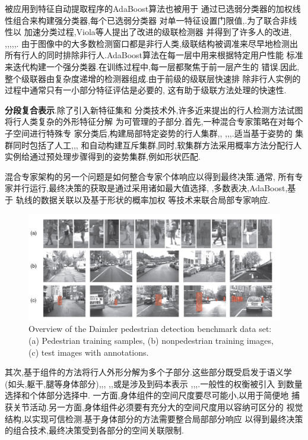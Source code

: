 \documentclass[10pt,letterpaper,journal,compsoc]{IEEEtran}
\begin{document}
被应用到特征自动提取程序的AdaBoost算法\cite{bib18}也被用于
通过已选弱分类器的加权线性组合来构建强分类器,每个已选弱分类器
对单一特征设置门限值\cite{bib60},\cite{bib62}.为了联合非线性以
加速分类过程,Viola等人提出了改进的级联检测器
\cite{bib74}并得到了许多人的改进\cite{bib45},\cite{bib52}
,\cite{bib63},\cite{bib71},\cite{bib76},\cite{bib80},\cite{bib83}.
由于图像中的大多数检测窗口都是非行人类,级联结构被调准来尽早地检测出
所有行人的同时排除非行人.AdaBoost算法在每一层中用来根据特定用户性能
标准来迭代构建一个强分类器.在训练过程中,每一层都聚焦于前一层产生的
错误.因此,整个级联器由复杂度递增的检测器组成.由于前级的级联层快速排
除非行人实例的过程中通常只有一小部分特征评估是必要的,
这有助于级联方法处理的快速性.

\textbf{分段复合表示}.除了引入新特征集和
分类技术外,许多近来提出的行人检测方法试图将行人类复杂的外形特征分解
为可管理的子部分.首先,一种混合专家策略在对每个子空间进行特殊专
家分类后,构建局部特定姿势的行人集群\cite{bib23},\cite{bib51},
\cite{bib62},\cite{bib64},\cite{bib76},\cite{bib80}.适当基于姿势的
集群同时包括了人工\cite{bib51},\cite{bib62},\cite{bib64},\cite{bib76}
和自动构建\cite{bib80}互斥集群,同时,软集群方法采用概率方法分配行人
实例给通过预处理步骤得到的姿势集群,例如形状匹配\cite{bib23}.

混合专家架构的另一个问题是如何整合专家个体响应以得到最终决策.通常,
所有专家并行运行,最终决策的获取是通过采用诸如最大值选择\cite{bib51},
\cite{bib76},多数表决\cite{bib64},AdaBoost\cite{bib62},基于
轨线的数据关联\cite{bib80}以及基于形状的概率加权\cite{bib23}
等技术来联合局部专家响应.

\begin{figure}[!t]
\centering
\includegraphics[width=7in]{fig1.JPG}
\caption{Overview of the Daimler pedestrian detection benchmark data set: (a) Pedestrian training samples, (b) nonpedestrian training images, (c) test
images with annotations.}
\end{figure}

其次,基于组件的方法将行人外形分解为多个子部分.这些部分既受启发于语义学
(如头,躯干,腿等身体部分)\cite{bib2},\cite{bib45},\cite{bib48},
\cite{bib62},\cite{bib65},\cite{bib76}或是涉及到码本表示
\cite{bib1},\cite{bib39},\cite{bib40},\cite{bib61}.一般性的权衡被引入
到数量选择和个体部分选择中.
一方面,身体组件的空间尺度要尽可能小,以用于简便地
捕获关节活动.另一方面,身体组件必须要有充分大的空间尺度用以容纳可区分的
视觉结构,以实现可信检测.基于身体部分的方法需要整合局部部分响应
以得到最终决策的组合技术,最终决策受到各部分的空间关联限制.
\end{document}
